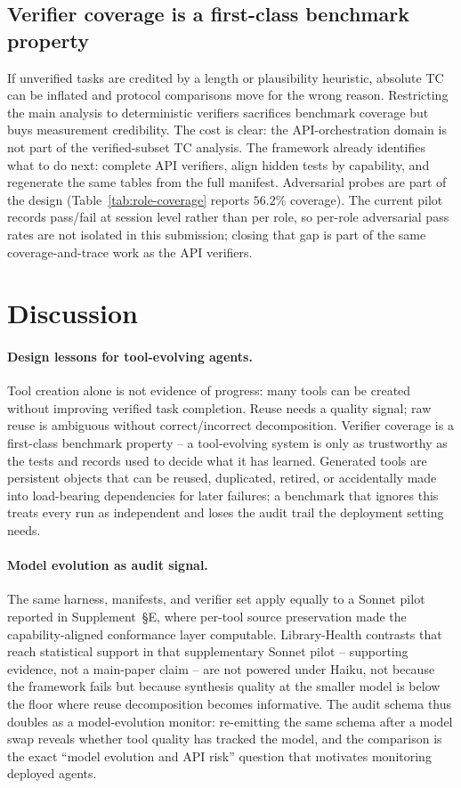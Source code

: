 \documentclass[sigconf,anonymous,natbib=false]{acmart}
\begin{document}
\subsection{Verifier coverage is a first-class benchmark property}

If unverified tasks are credited by a length or plausibility heuristic, absolute TC can be inflated and protocol comparisons move for the wrong reason. Restricting the main analysis to deterministic verifiers sacrifices benchmark coverage but buys measurement credibility. The cost is clear: the API-orchestration domain is not part of the verified-subset TC analysis. The framework already identifies what to do next: complete API verifiers, align hidden tests by capability, and regenerate the same tables from the full manifest. Adversarial probes are part of the design (Table~\ref{tab:role-coverage} reports $56.2$\% coverage). The current pilot records pass/fail at session level rather than per role, so per-role adversarial pass rates are not isolated in this submission; closing that gap is part of the same coverage-and-trace work as the API verifiers.

\section{Discussion}

\paragraph{Design lessons for tool-evolving agents.}
Tool creation alone is not evidence of progress: many tools can be created without improving verified task completion. Reuse needs a quality signal; raw reuse is ambiguous without correct/incorrect decomposition. Verifier coverage is a first-class benchmark property -- a tool-evolving system is only as trustworthy as the tests and records used to decide what it has learned. Generated tools are persistent objects that can be reused, duplicated, retired, or accidentally made into load-bearing dependencies for later failures; a benchmark that ignores this treats every run as independent and loses the audit trail the deployment setting needs.

\paragraph{Model evolution as audit signal.}
\label{sec:model-evo}
The same harness, manifests, and verifier set apply equally to a Sonnet pilot reported in Supplement~\S E, where per-tool source preservation made the capability-aligned conformance layer computable. Library-Health contrasts that reach statistical support in that supplementary Sonnet pilot -- supporting evidence, not a main-paper claim -- are not powered under Haiku, not because the framework fails but because synthesis quality at the smaller model is below the floor where reuse decomposition becomes informative. The audit schema thus doubles as a model-evolution monitor: re-emitting the same schema after a model swap reveals whether tool quality has tracked the model, and the comparison is the exact ``model evolution and API risk'' question that motivates monitoring deployed agents.
\end{document}

